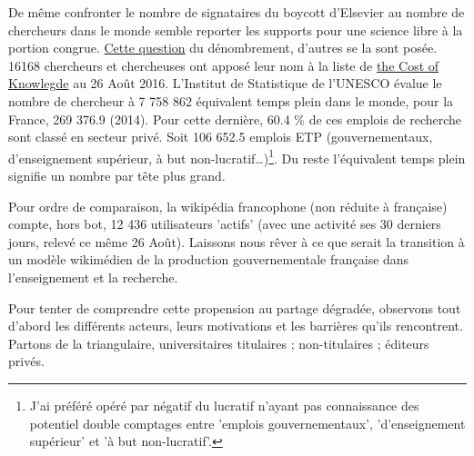 De même confronter le nombre de signataires du boycott d'Elsevier au nombre de chercheurs dans le monde semble reporter les supports pour une science libre à la portion congrue.
\href{https://www.quora.com/How-many-academic-scientists-are-there-in-the-world-Said-another-way-what-is-the-total-number-of-scientists-worldwide-who-publish-their-work}{Cette question} du dénombrement, d'autres se la sont posée.
16168 chercheurs et chercheuses ont apposé leur nom à la liste de \href{http://thecostofknowledge.com/#list}{the Cost of Knowlegde} au 26 Août 2016.
L'Institut de Statistique de l'UNESCO évalue le nombre de chercheur à 7 758 862 équivalent temps plein dans le monde,
pour la France, 269 376.9 (2014).
Pour cette dernière, 60.4 \% de ces emplois de recherche sont classé en secteur privé.
Soit 106 652.5 emplois ETP (gouvernementaux, d'enseignement supérieur, à but non-lucratif\ldots)\footnote{J'ai préféré opéré par négatif du lucratif n'ayant pas connaissance des potentiel double comptages entre 'emplois gouvernementaux', 'd'enseignement supérieur' et 'à but non-lucratif'.}.
Du reste l'équivalent temps plein signifie un nombre par tête plus grand.

Pour ordre de comparaison, la wikipédia francophone (non réduite à française) compte, hors bot, 12 436 utilisateurs 'actifs' (avec une activité ses 30 derniers jours, relevé ce même 26 Août).
Laissons nous rêver à ce que serait la transition à un modèle wikimédien de la production gouvernementale française dans l'enseignement et la recherche.

Pour tenter de comprendre cette propension au partage dégradée, observons tout d'abord les différents acteurs, leurs motivations et les barrières qu'ils rencontrent.
Partons de la triangulaire, universitaires titulaires ; non-titulaires ; éditeurs privés.


